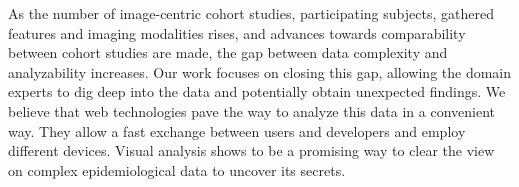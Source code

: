 \documentclass[journal]{style/vgtc} 			          %
\begin{document}
%
%
As the number of image-centric cohort studies, participating subjects, gathered features and imaging modalities rises, and advances towards comparability between cohort studies are made, the gap between data complexity and analyzability increases.
%
Our work focuses on closing this gap, allowing the domain experts to dig deep into the data and potentially obtain unexpected findings.
%
We believe that web technologies pave the way to analyze this data in a convenient way.
%
They allow a fast exchange between users and developers and employ different devices.
%
Visual analysis shows to be a promising way to clear the view on complex epidemiological data to uncover its secrets.
\end{document}
